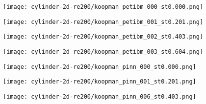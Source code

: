 
\begin{figure*} [h]
    \centering%
    \texttt{[image: cylinder-2d-re200/koopman\_petibm\_000\_st0.000.png]}%
    \caption{%
        The \num{1}st mode in PetIBM.
    }
    \label{fig:cylinder-re200-koopman-petibm-1st}%
\end{figure*}

\begin{figure*} 
    \centering%
    \texttt{[image: cylinder-2d-re200/koopman\_petibm\_001\_st0.201.png]}%
    \caption{%
        The \num{2}nd mode in PetIBM.
    }
    \label{fig:cylinder-re200-koopman-petibm-2nd}%
\end{figure*}

\begin{figure*} 
    \centering%
    \texttt{[image: cylinder-2d-re200/koopman\_petibm\_002\_st0.403.png]}%
    \caption{%
        The \num{3}rd mode in PetIBM.
    }
    \label{fig:cylinder-re200-koopman-petibm-3rd}%
\end{figure*}

\begin{figure*} 
    \centering%
    \texttt{[image: cylinder-2d-re200/koopman\_petibm\_003\_st0.604.png]}%
    \caption{%
        The \num{4}th mode in PetIBM.
    }
    \label{fig:cylinder-re200-koopman-petibm-4th}%
\end{figure*}

\begin{figure*} 
    \centering%
    \texttt{[image: cylinder-2d-re200/koopman\_pinn\_000\_st0.000.png]}%
    \caption{%
        The \num{1}st primary mode in data-driven PINN.
    }
    \label{fig:cylinder-re200-koopman-pinn-primary-1st}%
\end{figure*}

\begin{figure*} 
    \centering%
    \texttt{[image: cylinder-2d-re200/koopman\_pinn\_001\_st0.201.png]}%
    \caption{%
        The \num{2}nd primary mode in data-driven PINN.
    }
    \label{fig:cylinder-re200-koopman-pinn-primary-2nd}%
\end{figure*}

\begin{figure*} 
    \centering%
    \texttt{[image: cylinder-2d-re200/koopman\_pinn\_006\_st0.403.png]}%
    \caption{%
        The \num{3}rd primary mode in data-driven PINN.
    }
    \label{fig:cylinder-re200-koopman-pinn-primary-3rd}%
\end{figure*}

